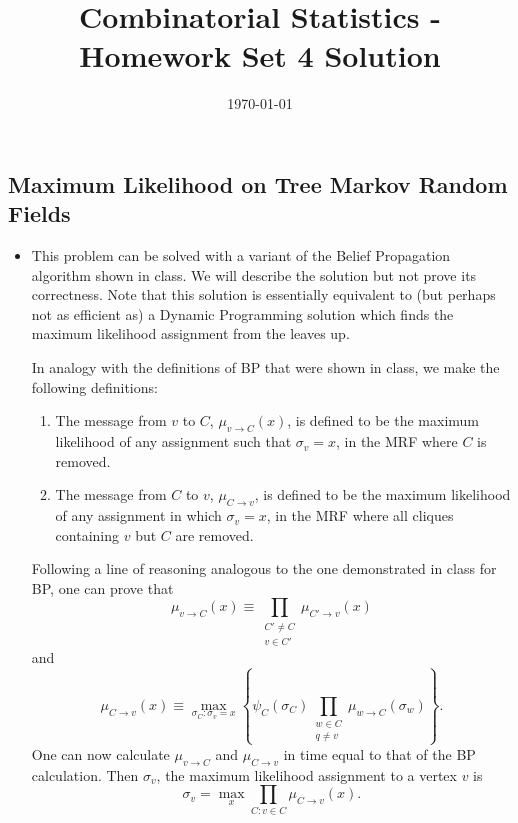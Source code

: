 \documentclass[11pt]{article} \usepackage{amssymb}
\begin{document}
\title{Combinatorial Statistics - Homework Set 4 Solution}

\date{\today}
\maketitle
\subsection{Maximum Likelihood on Tree Markov Random Fields}
\begin{itemize}
\item This problem can be solved with a variant of the Belief
  Propagation algorithm shown in class. We will describe the solution
  but not prove its correctness. Note that this solution is
  essentially equivalent to (but perhaps not as efficient as) a
  Dynamic Programming solution which finds the maximum likelihood
  assignment from the leaves up.
   
  In analogy with the definitions of BP that were shown in class, we
  make the following definitions:
  \begin{enumerate}
  \item The message from $v$ to $C$, $\mu_{v\to C}(x)$, is defined to
    be the maximum likelihood of any assignment such that
    $\sigma_v=x$, in the MRF where $C$ is removed.
  \item The message from $C$ to $v$, $\mu_{C\to v}$, is defined to be
    the maximum likelihood of any assignment in which $\sigma_v=x$, in
    the MRF where all cliques containing $v$ but $C$ are removed.
  \end{enumerate}
  Following a line of reasoning analogous to the one demonstrated in
  class for BP, one can prove that
  \begin{equation}
    \label{eq:bp1}
    \mu_{v\to C}(x) \equiv
    \prod_{\substack{C'\neq C\\ v\in C'}}\mu_{C'\to v}(x)
  \end{equation}
  and
  \begin{equation}
    \label{eq:bp2}
    \mu_{C\to v}(x) \equiv
    \max_{\sigma_C:\sigma_v=x}
    \left\{
      \psi_C(\sigma_C)
      \prod_{\substack{w\in C\\ q\neq v}}\mu_{w\to C}(\sigma_w)
    \right\}.
  \end{equation}
  One can now calculate $\mu_{v\to C}$ and $\mu_{C\to v}$ in time
  equal to that of the BP calculation.  Then $\sigma_v$, the maximum
  likelihood assignment to a vertex $v$ is
  \begin{equation}
    \label{eq:bp3}
    \sigma_v=\max_{x}\prod_{C:v\in C}\mu_{C\to v}(x).
  \end{equation}
  

\end{itemize}
\end{document}
